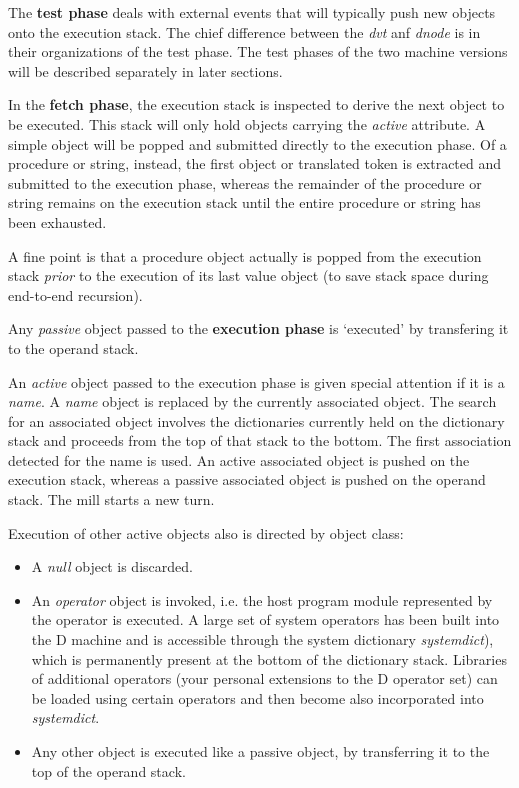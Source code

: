 The \textbf{test phase} deals with external events that will typically push new objects onto the execution stack. The chief difference between the \emph{dvt} anf \emph{dnode} is in their organizations of the test phase. The test phases of the two machine versions will be described separately in later sections. 

In the \textbf{fetch    phase},    the   execution   stack   is   inspected    to derive the next object to be executed. This stack will only hold objects carrying the  \emph{active}  attribute.   A  simple  object   will be popped   and submitted directly to the  execution  phase.  Of a  procedure  or string, instead, the first object or translated token is extracted and submitted to the execution phase, whereas the remainder of the  procedure or string remains on the execution stack until the  entire procedure or string has been exhausted.

A fine point is that a procedure object actually is popped  from the  execution stack \emph{prior} to the execution of its last value object  (to save stack space during end-to-end recursion).

Any \emph{passive}  object  passed to the \textbf{execution  phase}  is  `executed'  by transfering it to the operand stack.

An  \emph{active} object passed to the execution phase is given special attention if it is a  \emph{name}.  A  \emph{name} object is replaced by the currently associated object.  The search for an associated  object  involves  the  dictionaries  currently  held  on  the dictionary  stack and proceeds from the top of  that  stack to the bottom. The first association detected for the name is used. An active associated object  is pushed on the execution stack,  whereas a  passive  associated object is pushed on the operand stack. The mill starts a new turn.

Execution  of other active objects also is directed by object class:
\begin{itemize}
\item A \emph{null} object is discarded.
\item An \emph{operator}  object  is  invoked, i.e.  the  host  program  module represented  by the operator is executed.  A large set of system operators has been built into the D machine and is accessible through the system dictionary \emph{systemdict}), which is permanently present at the bottom of the dictionary stack. Libraries of additional operators (your personal extensions to the D operator set) can be loaded using certain operators and then become also incorporated into \emph{systemdict}.
\item Any other object is executed like a passive object,  by  transferring it to the top of the operand stack.
\end{itemize}

